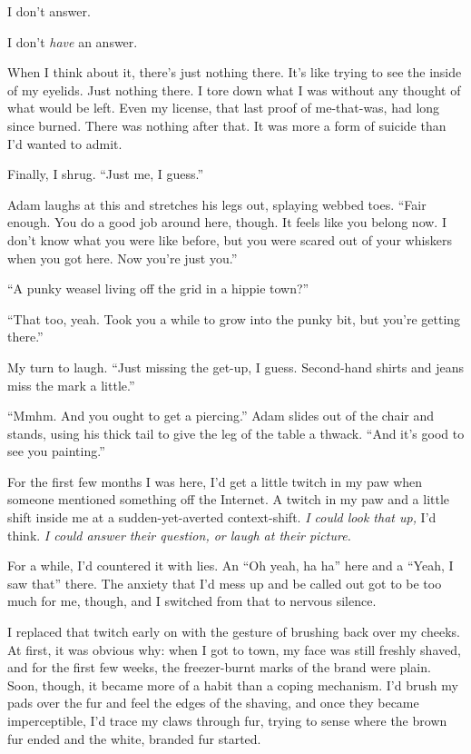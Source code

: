 I don't answer.

I don't \emph{have} an answer.

When I think about it, there's just nothing there. It's like trying to see the inside of my eyelids. Just nothing there. I tore down what I was without any thought of what would be left. Even my license, that last proof of me-that-was, had long since burned. There was nothing after that. It was more a form of suicide than I'd wanted to admit.

Finally, I shrug. ``Just me, I guess.''

Adam laughs at this and stretches his legs out, splaying webbed toes. ``Fair enough. You do a good job around here, though. It feels like you belong now. I don't know what you were like before, but you were scared out of your whiskers when you got here. Now you're just you.''

``A punky weasel living off the grid in a hippie town?''

``That too, yeah. Took you a while to grow into the punky bit, but you're getting there.''

My turn to laugh. ``Just missing the get-up, I guess. Second-hand shirts and jeans miss the mark a little.''

``Mmhm. And you ought to get a piercing.'' Adam slides out of the chair and stands, using his thick tail to give the leg of the table a thwack. ``And it's good to see you painting.''

\secdiv{}

\noindent For the first few months I was here, I'd get a little twitch in my paw when someone mentioned something off the Internet. A twitch in my paw and a little shift inside me at a sudden-yet-averted context-shift. \emph{I could look that up,} I'd think. \emph{I could answer their question, or laugh at their picture.}

For a while, I'd countered it with lies. An ``Oh yeah, ha ha'' here and a ``Yeah, I saw that'' there. The anxiety that I'd mess up and be called out got to be too much for me, though, and I switched from that to nervous silence.

I replaced that twitch early on with the gesture of brushing back over my cheeks. At first, it was obvious why: when I got to town, my face was still freshly shaved, and for the first few weeks, the freezer-burnt marks of the brand were plain. Soon, though, it became more of a habit than a coping mechanism. I'd brush my pads over the fur and feel the edges of the shaving, and once they became imperceptible, I'd trace my claws through fur, trying to sense where the brown fur ended and the white, branded fur started.

